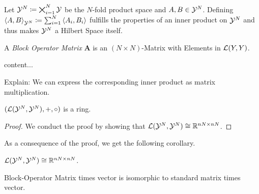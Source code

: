 Let $\mathcal{Y}^N \coloneqq \bigtimes_{i=1}^N \mathcal{Y}$ be the $N$-fold product space and $A, B \in \mathcal{Y}^N$.
Defining $\left < A, B \right >_{\mathcal{Y}^N} \coloneqq \sum_{i=1}^{N} \left <A_i, B_i \right >$ fulfills the properties of an inner product on $\cY^N$ and thus makes $\cY^N$ a Hilbert Space itself.


\begin{definition}
	A \emph{Block Operator Matrix} $\mathbf{A}$ is an $(N \times N)$-Matrix with Elements in $\mathcal{L}(Y, Y)$.
\end{definition}

\begin{definition}[$\cY^N$]
	content... 
\end{definition}
Explain: We can express the corresponding inner product as matrix multiplication.

\begin{theorem}
	$(\mathcal{L}(\mathcal{Y}^N, \mathcal{Y}^N), +, \circ)$ is a  ring.
\end{theorem}
\begin{proof}
	We conduct the proof by showing that $\mathcal{L}(\mathcal{Y}^N, \mathcal{Y}^N) \cong \mathbb{R}^{nN \times nN}$.
\end{proof}

As a consequence of the proof, we get the following corollary.
\begin{corollary}
	\label{cor:matrix-ring-equivalence}
	$\mathcal{L}(\mathcal{Y}^N, \mathcal{Y}^N) \cong \mathbb{R}^{nN \times nN}$.
\end{corollary}

\begin{corollary}
	\label{cor:matrix-vector-equivalence}
	Block-Operator Matrix times vector is isomorphic to standard matrix times vector.
\end{corollary}



